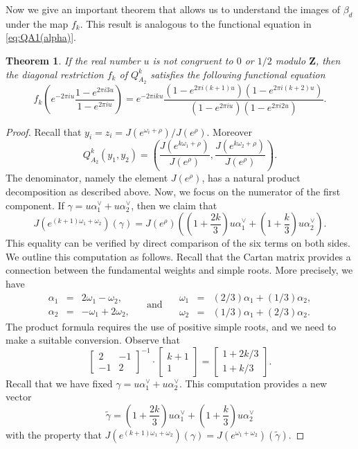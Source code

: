 \documentclass{amsart}
\newcommand{\Z}{\mathbf Z}
\numberwithin{equation}{section}
\theoremstyle{plain}
\newtheorem{theorem}{Theorem}
\theoremstyle{definition}
\begin{document}
Now we give an important theorem that allows us to understand the images of  $\beta_d$ under the map $f_k$. This result is analogous to the functional equation in \eqref{eq:QA1(alpha)}. 
\begin{theorem}\label{thm:fkbeta}
If the real number $u$ is not congruent to $0$ or $1/2$ modulo $\Z$, then the diagonal restriction $f_k$ of $Q^k_{A_2}$ satisfies the following functional equation
$$
f_k\left(e^{-2\pi iu}\frac{1-e^{2\pi i3u}}{1-e^{2\pi iu}} \right)=
e^{-2\pi iku}\frac{\left(1-e^{2\pi i(k+1)u}\right)\left(1-e^{2\pi i(k+2)u}\right)}{\left(1-e^{2\pi iu}\right)\left(1-e^{2\pi i2u}\right)}.
$$
\end{theorem}
\begin{proof}
Recall that $y_i=z_i=J(e^{\omega_i+\rho})/J(e^\rho)$. Moreover 
\[Q^k_{A_2}(y_1,y_2) = \left( \frac{J(e^{k\omega_1+\rho})}{J(e^\rho)}, \frac{J(e^{k\omega_2+\rho})}{J(e^\rho)} \right). \]
The denominator, namely the element $J(e^\rho)$, has a natural product decomposition as described above. Now, we focus on the numerator of the first component. If $\gamma=u\alpha_1^\vee+u\alpha_2^\vee$, then we claim that
$$
J\left(e^{(k+1)\omega_1+\omega_2}\right)(\gamma)=J\left(e^{\rho}\right)\left(\left(1+\frac{2k}{3}\right)u\alpha_1^\vee+\left(1+\frac{k}{3}\right)u\alpha_2^\vee\right).
$$
This equality can be verified by direct comparison of the six terms on both sides. We outline this computation as follows. Recall that the Cartan matrix provides a connection between the fundamental weights and simple roots. More precisely, we have
\[ \begin{array}{rcl}	
	\alpha_1 &=& 2\omega_1 - \omega_2,\\
	\alpha_2 &=& -\omega_1 +2\omega_2,\end{array}
\quad \text{ and } \quad
\begin{array}{rcl}	
	\omega_1 &=& (2/3)\alpha_1 + (1/3)\alpha_2,\\
	\omega_2 &=& (1/3)\alpha_1 + (2/3)\alpha_2.\end{array} 	
\]
The product formula requires the use of positive simple roots, and we need to make a suitable conversion. Observe that
\[\begin{bmatrix}2&-1\\-1&2\end{bmatrix}^{-1}\cdot 
\begin{bmatrix}k+1\\1\end{bmatrix} =
\begin{bmatrix}1+2k/3\\1+k/3\end{bmatrix}.
\]
Recall that we have fixed $\gamma=u\alpha_1^\vee+u\alpha_2^\vee$. This computation provides a new vector
\[\tilde\gamma = \left(1+\frac{2k}{3}\right)u\alpha_1^\vee + \left(1+\frac{k}{3}\right)u\alpha_2^\vee\]
with the property that $J\left(e^{(k+1)\omega_1+\omega_2}\right)(\gamma)=J\left(e^{\omega_1+\omega_2}\right)\left(\tilde\gamma\right).$
\end{proof}
\end{document}

